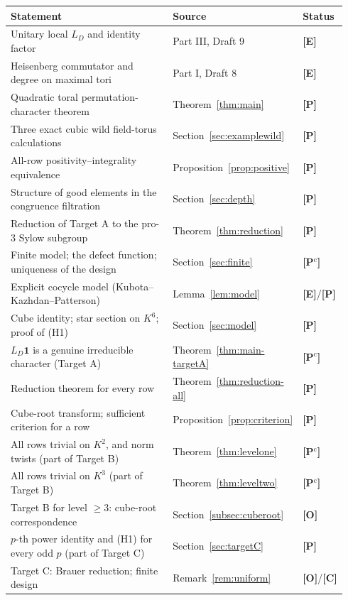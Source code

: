 \documentclass[11pt]{article}
\newcommand{\Ptag}{\textnormal{\textbf{[P]}}}
\newcommand{\Pctag}{\textnormal{\textbf{[P$^{\mathrm c}$]}}}
\newcommand{\Etag}{\textnormal{\textbf{[E]}}}
\newcommand{\Otag}{\textnormal{\textbf{[O]}}}
\newcommand{\Ctag}{\textnormal{\textbf{[C]}}}
\theoremstyle{plain}
\theoremstyle{definition}
\begin{document}
\begin{center}\small
\begin{tabular}{@{}p{0.60\linewidth}p{0.26\linewidth}p{0.08\linewidth}@{}}
\toprule
Statement & Source & Status\\\midrule
Unitary local $L_D$ and identity factor & Part III, Draft 9 & \Etag\\
Heisenberg commutator and degree on maximal tori & Part I, Draft 8 & \Etag\\
Quadratic toral permutation-character theorem & Theorem~\ref{thm:main} & \Ptag\\
Three exact cubic wild field-torus calculations & Section~\ref{sec:examplewild} & \Ptag\\
All-row positivity--integrality equivalence & Proposition~\ref{prop:positive} & \Ptag\\
Structure of good elements in the congruence filtration & Section~\ref{sec:depth} & \Ptag\\
Reduction of Target A to the pro-$3$ Sylow subgroup & Theorem~\ref{thm:reduction} & \Ptag\\
Finite model; the defect function; uniqueness of the design & Section~\ref{sec:finite} & \Pctag\\
Explicit cocycle model (Kubota--Kazhdan--Patterson) & Lemma~\ref{lem:model} & \Etag/\Ptag\\
Cube identity; star section on $K^6$; proof of (H1) & Section~\ref{sec:model} & \Ptag\\
$L_D\mathbf1$ is a genuine irreducible character (Target A) & Theorem~\ref{thm:main-targetA} & \Pctag\\
Reduction theorem for every row & Theorem~\ref{thm:reduction-all} & \Ptag\\
Cube-root transform; sufficient criterion for a row & Proposition~\ref{prop:criterion} & \Ptag\\
All rows trivial on $K^2$, and norm twists (part of Target B) & Theorem~\ref{thm:levelone} & \Pctag\\
All rows trivial on $K^3$ (part of Target B) & Theorem~\ref{thm:leveltwo} & \Pctag\\
Target B for level $\ge3$: cube-root correspondence & Section~\ref{subsec:cuberoot} & \Otag\\
$p$-th power identity and (H1) for every odd $p$ (part of Target C) & Section~\ref{sec:targetC} & \Ptag\\
Target C: Brauer reduction; finite design & Remark~\ref{rem:uniform} & \Otag/\Ctag\\
\bottomrule
\end{tabular}
\end{center}
\end{document}
